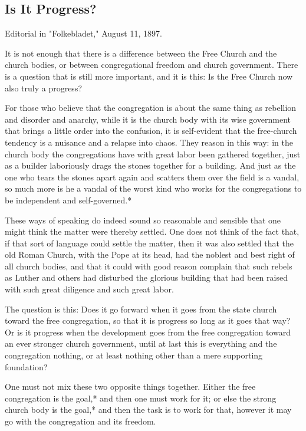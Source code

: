
\subsection{Is It Progress?}

Editorial in "Folkebladet," August 11, 1897.

It is not enough that there is a difference between the Free Church and the church bodies, or between congregational freedom and church government. There is a question that is still more important, and it is this: Is the Free Church now also truly a progress?

For those who believe that the congregation is about the same thing as rebellion and disorder and anarchy, while it is the church body with its wise government that brings a little order into the confusion, it is self-evident that the free-church tendency is a nuisance and a relapse into chaos. They reason in this way: in the church body the congregations have with great labor been gathered together, just as a builder laboriously drags the stones together for a building. And just as the one who tears the stones apart again and scatters them over the field is a vandal, so much more is he a vandal of the worst kind who works for the congregations to be independent and self-governed.*

These ways of speaking do indeed sound so reasonable and sensible that one might think the matter were thereby settled. One does not think of the fact that, if that sort of language could settle the matter, then it was also settled that the old Roman Church, with the Pope at its head, had the noblest and best right of all church bodies, and that it could with good reason complain that such rebels as Luther and others had disturbed the glorious building that had been raised with such great diligence and such great labor.

The question is this: Does it go forward when it goes from the state church toward the free congregation, so that it is progress so long as it goes that way? Or is it progress when the development goes from the free congregation toward an ever stronger church government, until at last this is everything and the congregation nothing, or at least nothing other than a mere supporting foundation?

One must not mix these two opposite things together. Either the free congregation is the goal,* and then one must work for it; or else the strong church body is the goal,* and then the task is to work for that, however it may go with the congregation and its freedom.

